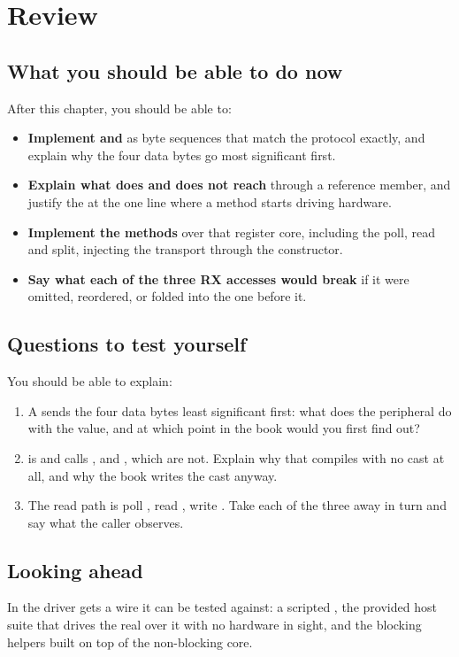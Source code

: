 
\section{Review}
\label{c7:sec:review}

\subsection*{What you should be able to do now}
After this chapter, you should be able to:
\begin{itemize}
  \item \textbf{Implement  and } as byte sequences that match the
    protocol exactly, and explain why the four data bytes go most significant first.
  \item \textbf{Explain what  does and does not reach} through a reference member, and
    justify the  at the one line where a  method starts driving
    hardware.
  \item \textbf{Implement the  methods} over that register core, including the poll, read
    and  split, injecting the transport through the constructor.
  \item \textbf{Say what each of the three RX accesses would break} if it were omitted, reordered, or
    folded into the one before it.
\end{itemize}

\subsection*{Questions to test yourself}
You should be able to explain:
\begin{enumerate}
  \item A  sends the four data bytes least significant first: what does the
    peripheral do with the value, and at which point in the book would you first find out?
  \item {} is  and calls ,  and
    , which are not. Explain why that compiles with no cast at all, and why the book
    writes the cast anyway.
  \item The read path is poll , read , write . Take each of
    the three away in turn and say what the caller observes.
\end{enumerate}

\subsection*{Looking ahead}
In  the driver gets a wire it can be tested against: a scripted
, the provided host suite that drives the real  over it with
no hardware in sight, and the blocking helpers built on top of the non-blocking core.
